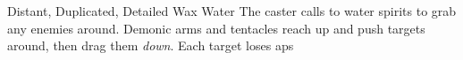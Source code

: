  {Distant, Duplicated, Detailed}%
  {Wax}%
  {Water}%
  {}%
  {The caster calls to water spirits to grab any enemies around.
    Demonic arms and tentacles reach up and push targets around, then drag them \emph{down}.
    Each target loses  \glspl{ap}}%
  {}
